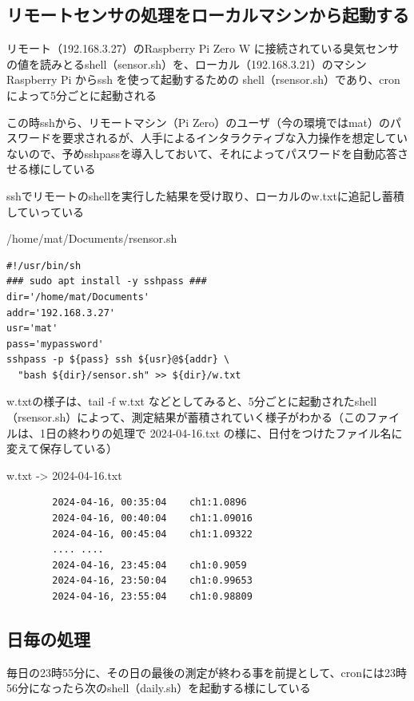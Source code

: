 \documentclass[12pt,a4paper,uplatex]{jsbook}
\begin{document}
\newpage

\subsection{リモートセンサの処理をローカルマシンから起動する}

リモート（192.168.3.27）のRaspberry Pi Zero W に接続されている臭気センサの値を読みとるshell（sensor.sh）を、ローカル（192.168.3.21）のマシンRaspberry Pi からssh を使って起動するための shell（rsensor.sh）であり、cronによって5分ごとに起動される

この時sshから、リモートマシン（Pi Zero）のユーザ（今の環境ではmat）のパスワードを要求されるが、人手によるインタラクティブな入力操作を想定していないので、予めsshpassを導入しておいて、それによってパスワードを自動応答させる様にしている

sshでリモートのshellを実行した結果を受け取り、ローカルのw.txtに追記し蓄積していっている

\begin{itembox}[l]{/home/mat/Documents/rsensor.sh}
	\begin{verbatim}
#!/usr/bin/sh
### sudo apt install -y sshpass ###
dir='/home/mat/Documents'
addr='192.168.3.27'
usr='mat'
pass='mypassword'
sshpass -p ${pass} ssh ${usr}@${addr} \
  "bash ${dir}/sensor.sh" >> ${dir}/w.txt
	\end{verbatim}
\end{itembox}

w.txtの様子は、tail -f w.txt などとしてみると、5分ごとに起動されたshell（rsensor.sh）によって、測定結果が蓄積されていく様子がわかる（このファイルは、1日の終わりの処理で 2024-04-16.txt の様に、日付をつけたファイル名に変えて保存している）

\begin{itembox}[l]{w.txt -> 2024-04-16.txt}
	\begin{verbatim}
		2024-04-16, 00:35:04	ch1:1.0896
		2024-04-16, 00:40:04	ch1:1.09016
		2024-04-16, 00:45:04	ch1:1.09322
		.... ....
		2024-04-16, 23:45:04	ch1:0.9059
		2024-04-16, 23:50:04	ch1:0.99653
		2024-04-16, 23:55:04	ch1:0.98809
	\end{verbatim}
\end{itembox}

\subsection{日毎の処理}

毎日の23時55分に、その日の最後の測定が終わる事を前提として、cronには23時56分になったら次のshell（daily.sh）を起動する様にしている
\end{document}
